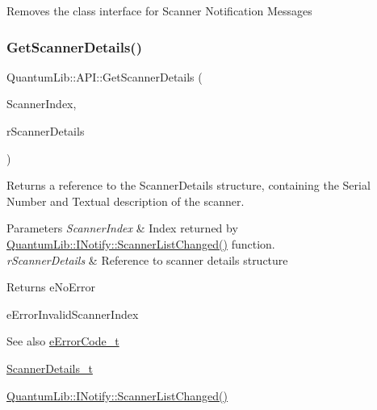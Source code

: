 Removes the class interface for Scanner Notification Messages \mbox{\label{class_quantum_lib_1_1_a_p_i_a69765cc3f7ccd4e1a6c8a3f3f0b0aeeb}} 
\subsubsection{\texorpdfstring{Get\+Scanner\+Details()}{GetScannerDetails()}}
{\footnotesize\ttfamily Quantum\+Lib\+::\+A\+P\+I\+::\+Get\+Scanner\+Details (\begin{DoxyParamCaption}\item[{uint32\+\_\+t}]{Scanner\+Index,  }\item[{\mbox{\hyperlink{struct_quantum_lib_1_1_scanner_details__t}{Scanner\+Details\+\_\+t}} \&}]{r\+Scanner\+Details }\end{DoxyParamCaption})\hspace{0.3cm}{\ttfamily [static]}}

Returns a reference to the Scanner\+Details structure, containing the Serial Number and Textual description of the scanner. 
\begin{DoxyParams}{Parameters}
{\em Scanner\+Index} & Index returned by \mbox{\hyperlink{class_quantum_lib_1_1_i_notify_a5b91aeecff71a2232cddf73199cc0213}{Quantum\+Lib\+::\+I\+Notify\+::\+Scanner\+List\+Changed()}} function. \\
\hline
{\em r\+Scanner\+Details} & Reference to scanner details structure \\
\hline
\end{DoxyParams}
\begin{DoxyReturn}{Returns}
e\+No\+Error 

e\+Error\+Invalid\+Scanner\+Index 
\end{DoxyReturn}
\begin{DoxySeeAlso}{See also}
\mbox{\hyperlink{namespace_quantum_lib_ae3625bf7f9a1ca0d93adb9a2e0194d47}{e\+Error\+Code\+\_\+t}} 

\mbox{\hyperlink{struct_quantum_lib_1_1_scanner_details__t}{Scanner\+Details\+\_\+t}} 

\mbox{\hyperlink{class_quantum_lib_1_1_i_notify_a5b91aeecff71a2232cddf73199cc0213}{Quantum\+Lib\+::\+I\+Notify\+::\+Scanner\+List\+Changed()}} 
\end{DoxySeeAlso}
\mbox{\label{class_quantum_lib_1_1_a_p_i_a9102a0ac0ca44b4d4f7a677e48b3d277}} 
